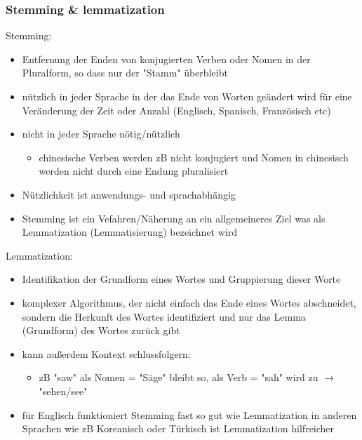 \documentclass[11pt]{article}
\begin{document}
\subsubsection{Stemming \& lemmatization}
\label{sec:orgf38a346}
Stemming:
\begin{itemize}
\item Entfernung der Enden von konjugierten Verben oder Nomen in der Pluralform, so dass nur der "Stamm" überbleibt
\item nützlich in jeder Sprache in der das Ende von Worten geändert wird für eine Veränderung der Zeit oder Anzahl (Englisch, Spanisch, Französisch etc)
\item nicht in jeder Sprache nötig/nützlich
\begin{itemize}
\item chinesische Verben werden zB nicht konjugiert und Nomen in chinesisch werden nicht durch eine Endung pluralisiert
\end{itemize}
\item Nützlichkeit ist anwendungs- und sprachabhängig
\item Stemming ist ein Vefahren/Näherung an ein allgemeineres Ziel was als Lemmatization (Lemmatisierung) bezeichnet wird
\end{itemize}

Lemmatization:
\begin{itemize}
\item Identifikation der Grundform eines Wortes und Gruppierung dieser Worte
\item komplexer Algorithmus, der nicht einfach das Ende eines Wortes abschneidet, sondern die Herkunft des Wortes identifiziert und nur das Lemma (Grundform) des Wortes zurück gibt
\item kann außerdem Kontext schlussfolgern:
\begin{itemize}
\item zB "saw" als Nomen = "Säge" bleibt so, als Verb = "sah" wird zu \(\rightarrow\) "sehen/see"
\end{itemize}

\item für Englisch funktioniert Stemming fast so gut wie Lemmatization in anderen Sprachen wie zB Koreanisch oder Türkisch ist Lemmatization hilfreicher
\end{itemize}
\end{document}
